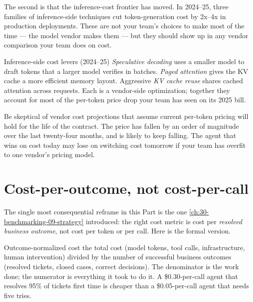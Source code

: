 The second is that the inference-cost frontier has moved. In 2024--25, three families of inference-side techniques cut token-generation cost by 2x--4x in production deployments. These are not your team's choices to make most of the time --- the model vendor makes them --- but they should show up in any vendor comparison your team does on cost.

\begin{TNinpractice}{Inference-side cost levers (2024--25)} \textit{Speculative decoding} uses a smaller model to draft tokens that a larger model verifies in batches. \textit{Paged attention} gives the KV cache a more efficient memory layout. Aggressive \textit{KV cache reuse} shares cached attention across requests. Each is a vendor-side optimization; together they account for most of the per-token price drop your team has seen on its 2025 bill. \end{TNinpractice}

\begin{TNwarning} Be skeptical of vendor cost projections that assume current per-token pricing will hold for the life of the contract. The price has fallen by an order of magnitude over the last twenty-four months, and is likely to keep falling. The agent that wins on cost today may lose on switching cost tomorrow if your team has overfit to one vendor's pricing model. \end{TNwarning}

\section{Cost-per-outcome, not cost-per-call}

The single most consequential reframe in this Part is the one \autoref{ch:30-benchmarking-09-strategy} introduced: the right cost metric is cost per \textit{resolved business outcome}, not cost per token or per call. Here is the formal version.

\begin{TNdefinition}{Outcome-normalized cost} the total cost (model tokens, tool calls, infrastructure, human intervention) divided by the number of successful business outcomes (resolved tickets, closed cases, correct decisions). The denominator is the work done; the numerator is everything it took to do it. A \$0.30-per-call agent that resolves 95\% of tickets first time is cheaper than a \$0.05-per-call agent that needs five tries. \end{TNdefinition}

